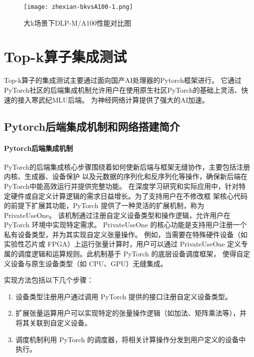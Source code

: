     \begin{figure}[ht]
        \centering
        \texttt{[image: zhexian-bkvsA100-1.png]}
        \caption{大k场景下DLP-M/A100性能对比图}
        \label{fig:bench_bk_vsa100_zhexian_1}
    \end{figure}
    

\section{Top-k算子集成测试}
Top-k算子的集成测试主要通过面向国产AI处理器的Pytorch框架进行。
它通过PyTorch社区的后端集成机制允许用户在使用原生社区PyTorch的基础上灵活、快速的接入寒武纪MLU后端。
为神经网络计算提供了强大的AI加速。


\subsection{Pytorch后端集成机制和网络搭建简介}
\paragraph{Pytorch后端集成机制}

PyTorch的后端集成核心步骤围绕着如何使新后端与框架无缝协作，主要包括注册内核、生成器、设备保护
以及元数据的序列化和反序列化等操作，确保新后端在PyTorch中能高效运行并提供完整功能。
在深度学习研究和实际应用中，针对特定硬件或自定义计算逻辑的需求日益增长。为了支持用户在不修改框
架核心代码的前提下扩展其功能，PyTorch 提供了一种灵活的扩展机制，称为 PrivateUseOne。
该机制通过注册自定义设备类型和操作逻辑，允许用户在 PyTorch 环境中实现特定需求。
PrivateUseOne 的核心功能是支持用户注册一个私有设备类型，并为其实现自定义张量操作。
例如，当需要在特殊硬件设备（如实验性芯片或 FPGA）上运行张量计算时，用户可以通过 
PrivateUseOne 定义专属的调度逻辑和运算规则。此机制基于 PyTorch 的底层设备调度框架，
使得自定义设备与原生设备类型（如 CPU、GPU）无缝集成。

实现方法包括以下几个步骤：
\begin{enumerate}
    \item {设备类型注册}用户通过调用 PyTorch 提供的接口注册自定义设备类型。
    \item{扩展张量运算}用户可以实现特定的张量操作逻辑（如加法、矩阵乘法等），并将其关联到自定义设备。
    \item{调度机制}利用 PyTorch 的调度器，将相关计算操作分发到用户定义的设备中执行。
\end{enumerate}

